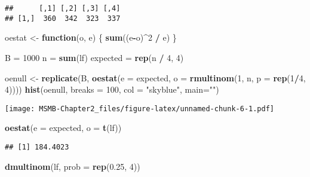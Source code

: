 \documentclass[]{article}
\newenvironment{Shaded}{\begin{snugshade}}{\end{snugshade}}
\newcommand{\KeywordTok}[1]{\textcolor[rgb]{0.13,0.29,0.53}{\textbf{#1}}}
\newcommand{\DataTypeTok}[1]{\textcolor[rgb]{0.13,0.29,0.53}{#1}}
\newcommand{\DecValTok}[1]{\textcolor[rgb]{0.00,0.00,0.81}{#1}}
\newcommand{\FloatTok}[1]{\textcolor[rgb]{0.00,0.00,0.81}{#1}}
\newcommand{\StringTok}[1]{\textcolor[rgb]{0.31,0.60,0.02}{#1}}
\newcommand{\ControlFlowTok}[1]{\textcolor[rgb]{0.13,0.29,0.53}{\textbf{#1}}}
\newcommand{\OperatorTok}[1]{\textcolor[rgb]{0.81,0.36,0.00}{\textbf{#1}}}
\newcommand{\NormalTok}[1]{#1}
\begin{document}
\begin{verbatim}
##      [,1] [,2] [,3] [,4]
## [1,]  360  342  323  337
\end{verbatim}

\begin{Shaded}
\begin{Highlighting}[]
\NormalTok{oestat <-}\StringTok{ }\ControlFlowTok{function}\NormalTok{(o, e) \{}
  \KeywordTok{sum}\NormalTok{((e}\OperatorTok{-}\NormalTok{o)}\OperatorTok{^}\DecValTok{2} \OperatorTok{/}\StringTok{ }\NormalTok{e)}
\NormalTok{\}}

\NormalTok{B =}\StringTok{ }\DecValTok{1000}
\NormalTok{n =}\StringTok{ }\KeywordTok{sum}\NormalTok{(lf)}
\NormalTok{expected =}\StringTok{ }\KeywordTok{rep}\NormalTok{(n }\OperatorTok{/}\StringTok{ }\DecValTok{4}\NormalTok{, }\DecValTok{4}\NormalTok{)}

\NormalTok{oenull <-}\StringTok{ }\KeywordTok{replicate}\NormalTok{(B,}
  \KeywordTok{oestat}\NormalTok{(}\DataTypeTok{e =}\NormalTok{ expected, }\DataTypeTok{o =} \KeywordTok{rmultinom}\NormalTok{(}\DecValTok{1}\NormalTok{, n, }\DataTypeTok{p =} \KeywordTok{rep}\NormalTok{(}\DecValTok{1}\OperatorTok{/}\DecValTok{4}\NormalTok{, }\DecValTok{4}\NormalTok{))))}
\KeywordTok{hist}\NormalTok{(oenull, }\DataTypeTok{breaks =} \DecValTok{100}\NormalTok{, }\DataTypeTok{col =} \StringTok{"skyblue"}\NormalTok{, }\DataTypeTok{main=}\StringTok{""}\NormalTok{)}
\end{Highlighting}
\end{Shaded}

\texttt{[image: MSMB-Chapter2\_files/figure-latex/unnamed-chunk-6-1.pdf]}

\begin{Shaded}
\begin{Highlighting}[]
\KeywordTok{oestat}\NormalTok{(}\DataTypeTok{e =}\NormalTok{ expected, }\DataTypeTok{o =} \KeywordTok{t}\NormalTok{(lf))}
\end{Highlighting}
\end{Shaded}

\begin{verbatim}
## [1] 184.4023
\end{verbatim}

\begin{Shaded}
\begin{Highlighting}[]
\KeywordTok{dmultinom}\NormalTok{(lf, }\DataTypeTok{prob =} \KeywordTok{rep}\NormalTok{(}\FloatTok{0.25}\NormalTok{, }\DecValTok{4}\NormalTok{))}
\end{Highlighting}
\end{Shaded}
\end{document}

